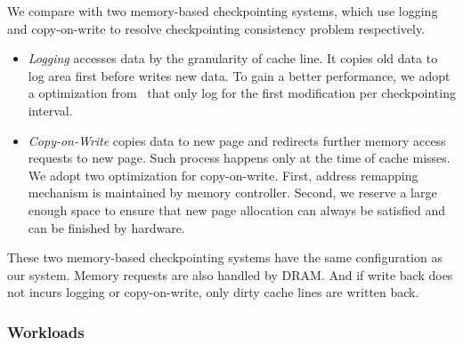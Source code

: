 \documentclass[conference]{IEEEtran}
\begin{document}
We compare with two memory-based checkpointing systems, which use logging and copy-on-write to resolve checkpointing consistency problem respectively.
\begin{itemize}
    \item \textit{Logging} accesses data by the granularity of cache line.
        It copies old data to log area first before writes new data.
        To gain a better performance, we adopt a optimization from~\cite{sorin_safetynet_2002} that only log for the first modification per checkpointing interval.
    \item \textit{Copy-on-Write} copies data to new page and redirects further memory access requests to new page.
        Such process happens only at the time of cache misses.
        We adopt two optimization for copy-on-write.
        First, address remapping mechanism is maintained by memory controller.
        Second, we reserve a large enough space to ensure that new page allocation can always be satisfied and can be finished by hardware.
\end{itemize}
These two memory-based checkpointing systems have the same configuration as our system.
Memory requests are also handled by DRAM\@.
And if write back does not incurs logging or copy-on-write, only dirty cache lines are written back.

\subsubsection{Workloads}
\end{document}
